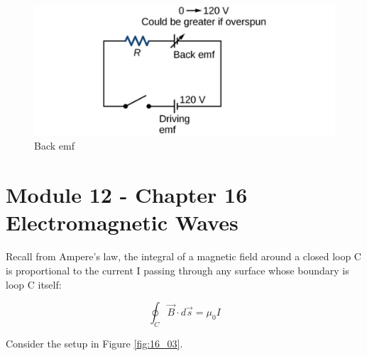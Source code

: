 \documentclass[14pt]{memoir}
\begin{document}
\begin{figure}[H]
\begin{center}
\includegraphics[scale=0.5]{fig/fig_13_31.jpg}
\caption{Back emf}
\label{fig:13_32}
\end{center}
\end{figure}


\chapter{Module 12 - Chapter 16 Electromagnetic Waves}

Recall from Ampere's law, the integral of a magnetic field around a closed loop C is proportional to the current I passing through any surface whose boundary is loop C itself:

\begin{equation}
\oint_C \vec{B} \cdot d\vec{s} = \mu_0 I
\end{equation}

Consider the setup in Figure \ref{fig:16_03}.
\end{document}
